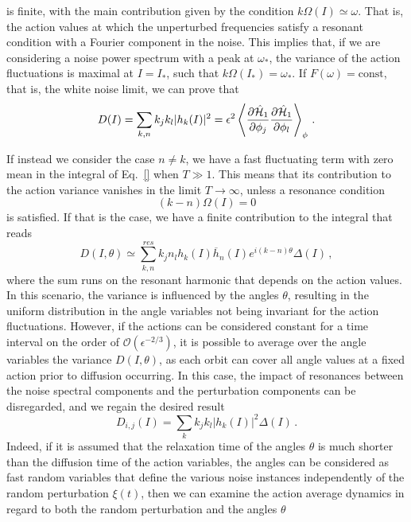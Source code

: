 is finite, with the main contribution given by the condition $k\Omega(I)\simeq \omega$. That is, the action values at which the unperturbed frequencies satisfy a resonant condition with a Fourier component in the noise. This implies that, if we are considering a noise power spectrum with a peak at $\omega_\ast$, the variance of the action fluctuations is maximal at $I=I_\ast$, such that $k\Omega(I_\ast)=\omega_\ast$. If $F(\omega)=\mathrm{const}$, that is, the white noise limit, we can prove that
\begin{equation}
    D(I)=\sum_{k,n} k_j k_l |h_k(I)|^2 =\epsilon^2\left \langle \frac{\partial \hat {\mathcal{H}}_1}{\partial \phi_j}\frac{\partial \hat {\mathcal{H}}_1}{\partial \phi_l}\right \rangle_\phi\,.
\end{equation}

If instead we consider the case $n\neq k$, we have a fast fluctuating term with zero mean in the integral of Eq.~\eqref{} when $T\gg 1$. This means that its contribution to the action variance vanishes in the limit $T\to\infty$, unless a resonance condition
\begin{equation}
    (k-n)\Omega(I)=0
\end{equation}
is satisfied. If that is the case, we have a finite contribution to the integral that reads
\begin{equation}
    D(I,\theta)\simeq \sum_{k,n}^{res} k_j n_l h_k(I) \overline{h}_n(I) e^{i (k-n)\theta}\Delta (I)\,,
\end{equation}
where the sum runs on the resonant harmonic that depends on the action values. In this scenario, the variance is influenced by the angles $\theta$, resulting in the uniform distribution in the angle variables not being invariant for the action fluctuations. However, if the actions can be considered constant for a time interval on the order of $\mathcal{O}(\epsilon^{-2/3})$, it is possible to average over the angle variables the variance $D(I,\theta)$, as each orbit can cover all angle values at a fixed action prior to diffusion occurring. In this case, the impact of resonances between the noise spectral components and the perturbation components can be disregarded, and we regain the desired result
\begin{equation}
    D_{i,j}(I)=\sum_{k} k_j k_l |h_k(I)|^2 \Delta(I)\,.
    \label{diffcoef}
\end{equation}
Indeed, if it is assumed that the relaxation time of the angles $\theta$ is much shorter than the diffusion time of the action variables, the angles can be considered as fast random variables that define the various noise instances independently of the random perturbation $\xi(t)$, then we can examine the action average dynamics in regard to both the random perturbation and the angles $\theta$
